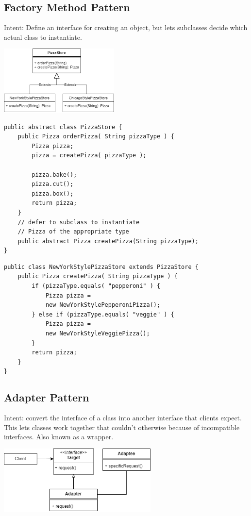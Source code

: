 \documentclass[8pt, letterpaper, titlepage]{article}
\begin{document}
\begin{multicols*}{2}
    \subsection*{Factory Method Pattern}
    Intent: Define an interface for creating an object, but lets subclasses decide which actual class to instantiate.
    \begin{center} 
        \includegraphics[width=6cm]{factory.png}
    \end{center}

    \begin{lstlisting}
public abstract class PizzaStore {
    public Pizza orderPizza( String pizzaType ) {
        Pizza pizza;
        pizza = createPizza( pizzaType );
        
        pizza.bake();
        pizza.cut();
        pizza.box();
        return pizza;
    }
    // defer to subclass to instantiate
    // Pizza of the appropriate type
    public abstract Pizza createPizza(String pizzaType);
}               
    \end{lstlisting}
    \begin{lstlisting}
public class NewYorkStylePizzaStore extends PizzaStore {
    public Pizza createPizza( String pizzaType ) {
        if (pizzaType.equals( "pepperoni" ) {
            Pizza pizza =
            new NewYorkStylePepperoniPizza();
        } else if (pizzaType.equals( "veggie" ) {
            Pizza pizza =
            new NewYorkStyleVeggiePizza();
        }
        return pizza;
    }
}        
    \end{lstlisting}
    \subsection*{Adapter Pattern}
    Intent: convert the interface of a class into another interface that clients expect. This lets classes work together that couldn't otherwise because of incompatible interfaces. Also known as a wrapper.

    \begin{center} 
        \includegraphics[width=8cm]{wrapper.png}
    \end{center}


\end{multicols*}
\end{document}
